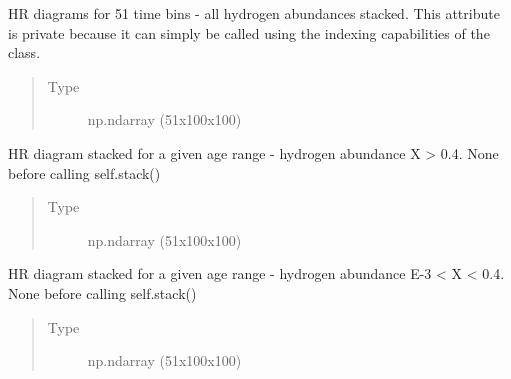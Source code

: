 \documentclass[letterpaper,10pt,english]{sphinxmanual}
\begin{document}
\begin{fulllineitems}
\begin{fulllineitems}
\begin{quote}
\begin{description}
\end{description}\end{quote}

\end{fulllineitems}


\begin{fulllineitems}
\label{\detokenize{hrdiagrams:hoki.hrdiagrams.HRDiagram.self._all_H}}
HR diagrams for 51 time bins - all hydrogen abundances stacked. This attribute is private
because it can simply be called using the indexing capabilities of the class.
\begin{quote}\begin{description}
\item[{Type}] \leavevmode
np.ndarray (51x100x100)

\end{description}\end{quote}

\end{fulllineitems}


\begin{fulllineitems}
\label{\detokenize{hrdiagrams:hoki.hrdiagrams.HRDiagram.self.high_H_stacked}}
HR diagram stacked for a given age range - hydrogen abundance X \textgreater{} 0.4. None before calling
self.stack()
\begin{quote}\begin{description}
\item[{Type}] \leavevmode
np.ndarray (51x100x100)

\end{description}\end{quote}

\end{fulllineitems}


\begin{fulllineitems}
\label{\detokenize{hrdiagrams:hoki.hrdiagrams.HRDiagram.self.medium_H_stacked}}
HR diagram stacked for a given age range - hydrogen abundance E-3 \textless{} X \textless{} 0.4. None before
calling self.stack()
\begin{quote}\begin{description}
\item[{Type}] \leavevmode
np.ndarray (51x100x100)


\end{description}
\end{quote}
\end{fulllineitems}
\end{fulllineitems}
\end{document}
